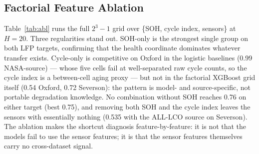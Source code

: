 \documentclass[preprint,12pt]{elsarticle}
\begin{document}
\begin{table}[!t]
\caption{Minimal Transfer Baselines at H=20: Pooled AUC With Cell-Level Bootstrap 95\% CI. The Distance Rule Is the Unfitted Score $0.80-$SOH.}
\label{tab:baselines}
\centering
{}
\end{table}

\subsection{Factorial Feature Ablation}
Table~\ref{tab:abl} runs the full $2^3-1$ grid over \{SOH, cycle index, sensors\} at $H{=}20$. Three regularities stand out. SOH-only is the strongest single group on both LFP targets, confirming that the health coordinate dominates whatever transfer exists. Cycle-only is competitive on Oxford in the logistic baselines (0.99 NASA-source) --- whose five cells fail at well-separated raw cycle counts, so the cycle index is a between-cell aging proxy --- but not in the factorial XGBoost grid itself (0.54 Oxford, 0.72 Severson): the pattern is model- and source-specific, not portable degradation knowledge. No combination without SOH reaches 0.76 on either target (best 0.75), and removing both SOH and the cycle index leaves the sensors with essentially nothing (0.535 with the ALL-LCO source on Severson). The ablation makes the shortcut diagnosis feature-by-feature: it is not that the models fail to use the sensor features; it is that the sensor features themselves carry no cross-dataset signal.
\end{document}
